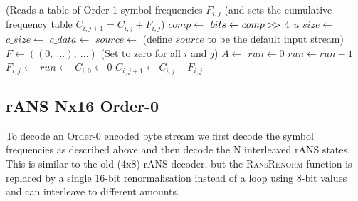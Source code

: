 \documentclass[a4paper]{article}
\begin{document}

\begin{algorithmic}[1]
\Statex (Reads a table of Order-1 symbol frequencies $F_{i,j}$
\Statex (and sets the cumulative frequency table $C_{i,j+1} = C_{i,j}+F_{i,j}$)
\State $comp \gets$ 
\State $bits \gets comp \mathbin{>\mkern-3mu>\,} 4$
  \State $u\_size \gets$  
  \State $c\_size \gets$  
  \State $c\_data \gets$ 
  \State $source \gets$  
\Else
  \State (define $source$ to be the default input stream)
\EndIf
\Statex
\State $F \gets ((0,\ ...),\ ...)$ \Comment(Set to zero for all $i$ and $j$)
\State $A \gets$ 
  \State $run \gets 0$
      \State $run \gets run-1$ 
    \Else
      \State $F_{i,j} \gets$ 
        \State $run \gets$ 
      \EndIf
    \EndIf
  \EndForeach
  \State {}
  \State
  \State $C_{i,0} \gets 0$
    \State $C_{i,j+1} \gets C_{i,j} + F_{i,j}$
  \EndFor
\EndForeach
\EndProcedure
\end{algorithmic}

\subsection{rANS Nx16 Order-0}

To decode an Order-0 encoded byte stream we first decode the symbol
frequencies as described above and then decode the N interleaved rANS
states.  This is similar to the old (4x8) rANS decoder, but the
\textsc{RansRenorm} function is replaced by a single 16-bit
renormalisation instead of a loop using 8-bit values and can
interleave to different amounts.
\end{document}

